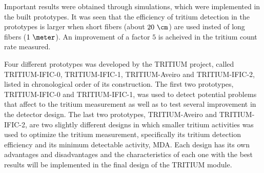 Important results were obtained through simulations, which were implemented in the built prototypes. It was seen that the efficiency of tritium detection in the prototypes is larger when short fibers (about $20~\cm$) are used insted of long fibers ($1~\meter$). An improvement of a factor $5$ is acheived in the tritium count rate measured.

Four different prototypes was developed by the TRITIUM project, called TRITIUM-IFIC-0, TRITIUM-IFIC-1, TRITIUM-Aveiro and TRITIUM-IFIC-2, listed in chronological order of its construction. The first two prototypes, TRITIUM-IFIC-0 and TRITIUM-IFIC-1, was used to detect potential problems that affect to the tritium measurement as well as to test several improvement in the detector design. The last two prototypes, TRITIUM-Aveiro and TRITIUM-IFIC-2, are two slightly different designs in which smaller tritium activities was used to optimize the tritium measurement, specifically its tritium detection efficiency and its minimum detectable activity, MDA. Each design has its own advantages and disadvantages and the characteristics of each one with the best results will be implemented in the final design of the TRITIUM module.

